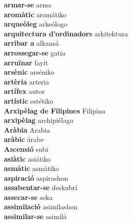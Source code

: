 \textbf{ armar-se  } arma \\
\textbf{ aromàtic  } aromátiko \\
\textbf{ arqueòleg  } arkeólogo \\
\textbf{ arquitectura d’ordinadors  } arkitektura \\
\textbf{ arribar a  } alkansá \\
\textbf{ arrossegar-se  } gatia \\
\textbf{ arruïnar  } fayit \\
\textbf{ arsènic  } arséniko \\
\textbf{ artèria  } arteria \\
\textbf{ artífex  } autor \\
\textbf{ artístic  } estétiko \\
\textbf{ Arxipèlag de Filipines  } Filipina \\
\textbf{ arxipèlag  } archipiélago \\
\textbf{ Aràbia  } Arabia \\
\textbf{ aràbic  } árabe \\
\textbf{ Ascensió  } subi \\
\textbf{ asiàtic  } asiátiko \\
\textbf{ asmàtic  } asmátiko \\
\textbf{ aspiració  } aspirashon \\
\textbf{ assabentar-se  } deskubrí \\
\textbf{ assecar-se  } seka \\
\textbf{ assimilació  } asimilashon \\
\textbf{ assimilar-se  } asimilá \\
